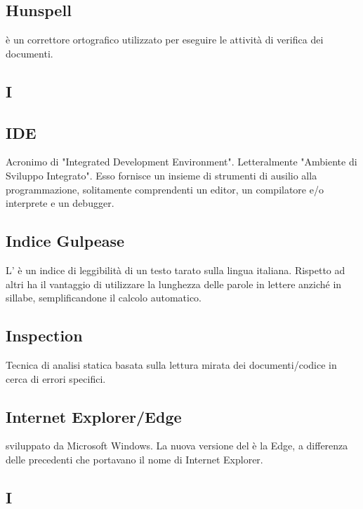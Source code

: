 \subsection*{Hunspell}
 è un correttore ortografico utilizzato per eseguire le attività di verifica dei documenti.

\newpage

\begin{center}
\Huge\section*{\uppercase{I}}
\end{center}

\subsection*{IDE}
Acronimo di "Integrated Development Environment". Letteralmente "Ambiente
di Sviluppo Integrato". Esso fornisce un insieme di strumenti di ausilio
alla programmazione, solitamente comprendenti un editor, un compilatore e/o
interprete e un debugger.

\subsection*{Indice Gulpease}
L' è un indice di leggibilità di un testo tarato sulla lingua
italiana. Rispetto ad altri ha il vantaggio di utilizzare la lunghezza delle parole in lettere
anziché in sillabe, semplificandone il calcolo automatico.

\subsection*{Inspection }
Tecnica di analisi statica basata sulla lettura mirata dei documenti/codice in cerca di
errori specifici.

\subsection*{Internet Explorer/Edge}
  sviluppato da Microsoft Windows. La nuova versione del  è la Edge, a differenza delle precedenti che portavano il nome di Internet Explorer.

\newpage

\begin{center}
\Huge\section*{\uppercase{i}}
\end{center}

